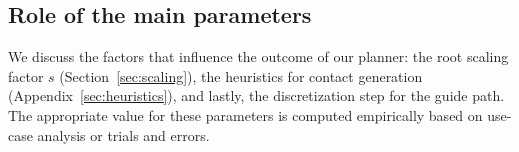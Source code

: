 \documentclass[journal]{IEEEtran}
\providecommand{\DIFdeltex}[1]{} %
\providecommand{\DIFdelbegin}{\protect\cbdelete} %
\providecommand{\DIFdelend}{} %
\providecommand{\DIFdelFL}[1]{\DIFdel{#1}} %
\providecommand{\DIFdel}[1]{\texorpdfstring{\DIFdeltex{#1}}{}} %
\begin{document}

 \subsection{Role of the main parameters} \label{sec:influence}
We discuss the factors that influence the outcome of our planner: the root scaling factor $s$ (Section~\ref{sec:scaling}), the heuristics for
contact generation (Appendix~\ref{sec:heuristics}), and lastly, the discretization step for the guide path. The appropriate value for these parameters
is computed empirically based on use-case analysis or trials and errors.
\end{document}
